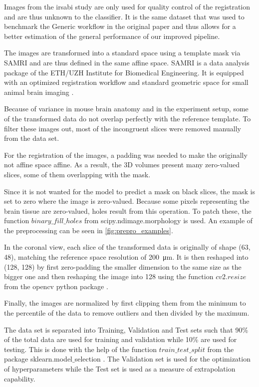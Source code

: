 Images from the irsabi study are only used for quality control of the registration and are thus unknown to the classifier.
It is the same dataset that was used to benchmark the Generic workflow in the original paper and thus allows for a better estimation of the general performance of our improved pipeline.

The images are transformed into a standard space using a template mask via SAMRI \cite{noauthor_ibt-fmi/samri_2019} and are thus defined in the same affine space.
SAMRI is a data analysis package of the ETH/UZH Institute for Biomedical Engineering.
It is equipped with an optimized registration workflow and standard geometric space for small animal brain imaging \cite{ioanas_optimized_2019}.

Because of variance in mouse brain anatomy and in the experiment setup, some of the transformed data do not overlap perfectly with the reference template.
To filter these images out, most of the incongruent slices were removed manually from the data set.

For the registration of the images, a padding was needed to make the originally not affine space affine.
As a result, the 3D volumes present many zero-valued slices, some of them overlapping with the mask.

Since it is not wanted for the model to predict a mask on black slices, the mask is set to zero where the image is zero-valued.
Because some pixels representing the brain tissue are zero-valued, holes result from this operation.
To patch these, the function \textcolor{mg}{\texttt{$binary\_fill\_holes$}} from scipy.ndimage.morphology \cite{noauthor_multi-dimensional_nodate} is used.
An example of the preprocessing can be seen in \cref{fig:prepro_examples}.

In the coronal view, each slice of the transformed data is originally of shape (63, 48), matching the reference space resolution of \SI{200}{\micro\metre}.
It is then reshaped into (128, 128) by first zero-padding the smaller dimension to the same size as the bigger one and then reshaping the image into 128 using the function \textcolor{mg}{\texttt{$cv2.resize$}} from the opencv python package \cite{noauthor_opencv-python_nodate}.

Finally, the images are normalized by first clipping them from the minimum to the  percentile of the data to remove outliers and then divided by the maximum.

The data set is separated into Training, Validation and Test sets such that 90\% of the total data are used for training and validation while 10\% are used for testing.
This is done with the help of the function \textcolor{mg}{\texttt{$train\_test\_split$}} from the package sklearn.model$\_$selection \cite{scikit-learn}.
The Validation set is used for the optimization of hyperparameters while the Test set is used as a measure of extrapolation capability.

